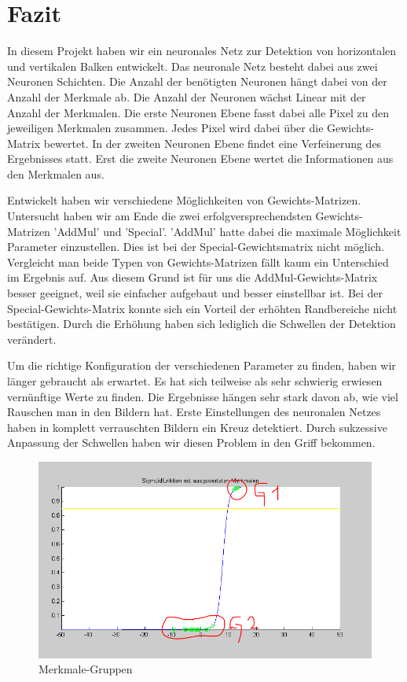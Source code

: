 \newpage
\section{Fazit}

In diesem Projekt haben wir ein neuronales Netz zur Detektion von horizontalen und vertikalen Balken entwickelt. Das neuronale Netz besteht dabei aus zwei Neuronen Schichten. Die Anzahl der benötigten Neuronen hängt dabei von der Anzahl der Merkmale ab. Die Anzahl der Neuronen wächst Linear mit der Anzahl der Merkmalen. Die erste Neuronen Ebene fasst dabei alle Pixel zu den jeweiligen Merkmalen zusammen. Jedes Pixel wird dabei über die Gewichts-Matrix bewertet. In der zweiten Neuronen Ebene findet eine Verfeinerung des Ergebnisses statt. Erst die zweite Neuronen Ebene wertet die Informationen aus den Merkmalen aus.

Entwickelt haben wir verschiedene Möglichkeiten von Gewichts-Matrizen. Untersucht haben wir am Ende die zwei erfolgversprechendsten Gewichts-Matrizen 'AddMul' und 'Special'. 'AddMul' hatte dabei die maximale Möglichkeit Parameter einzustellen. Dies ist bei der Special-Gewichtsmatrix nicht möglich. Vergleicht man beide Typen von Gewichts-Matrizen fällt kaum ein Unterschied im Ergebnis auf. Aus diesem Grund ist für uns die AddMul-Gewichts-Matrix besser geeignet, weil sie einfacher aufgebaut und besser einstellbar ist. Bei der Special-Gewichts-Matrix konnte sich ein Vorteil der erhöhten Randbereiche nicht bestätigen. Durch die Erhöhung haben sich lediglich die Schwellen der Detektion verändert.

Um die richtige Konfiguration der verschiedenen Parameter zu finden, haben wir länger gebraucht als erwartet. Es hat sich teilweise als sehr schwierig erwiesen vernünftige Werte zu finden. Die Ergebnisse hängen sehr stark davon ab, wie viel Rauschen man in den Bildern hat. Erste Einstellungen des neuronalen Netzes haben in komplett verrauschten Bildern ein Kreuz detektiert. Durch sukzessive Anpassung der Schwellen haben wir diesen Problem in den Griff bekommen. 

\begin{figure}[hbt]
	\centering
	\includegraphics[width=0.6\linewidth]{./Bilder/Auswertung/MerkmalGruppen}
	\caption{Merkmale-Gruppen}
	\label{mGrup}
\end{figure}

